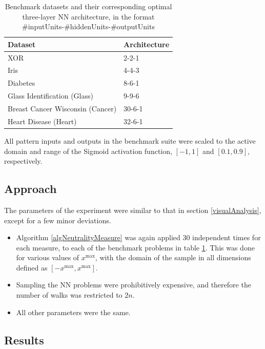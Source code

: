 \documentclass[conference]{IEEEtran}
\begin{document}
\begin{table}[!t] 
	\renewcommand{\arraystretch}{1.3}
	\caption{Benchmark datasets and their corresponding optimal three-layer NN architecture, in the format \#inputUnits-\#hiddenUnits-\#outputUnits}
	\label{tblNNBenchmarks}
	\centering
	\begin{tabular}{|l|l|}
		\hline
		\textbf{Dataset}		& \textbf{Architecture} \\ \hline				
		XOR									&  2-2-1		\\
		Iris								&  4-4-3 \cite{gupta1998weight}		\\
		Diabetes							&  8-6-1 \cite{carvalho2006particle}			\\
		Glass Identification (Glass)		&  9-9-6 \cite{gupta1998weight}			\\
		Breast Cancer Wisconsin (Cancer)	&  30-6-1 \cite{carvalho2006particle}		\\
		Heart Disease (Heart)				&  32-6-1 \cite{carvalho2006particle}	\\ \hline		
	\end{tabular}
\end{table}

All pattern inputs and outputs in the benchmark suite were scaled to the active domain and range of the Sigmoid activation function, $[-1,1]$ and $[0.1,0.9]$, respectively.
	
\subsection{Approach}
\label{nnApproach}
The parameters of the experiment were similar to that in section \ref{visualAnalysis}, except for a few minor deviations.

\begin{itemize}
	\item Algorithm \ref{algNeutralityMeasure} was again applied 30 independent times for each measure, to each of the benchmark problems in table \ref{tblNNBenchmarks}. This was done for various values of $x^{\text{max}}$, with the domain of the sample in all dimensions defined as $[-x^{\text{max}}, x^{\text{max}}]$.
	\item Sampling the NN problems were prohibitively expensive, and therefore the number of walks was restricted to $2n$.
	\item All other parameters were the same.
\end{itemize}

\subsection{Results}
\label{nnResults}
\end{document}
